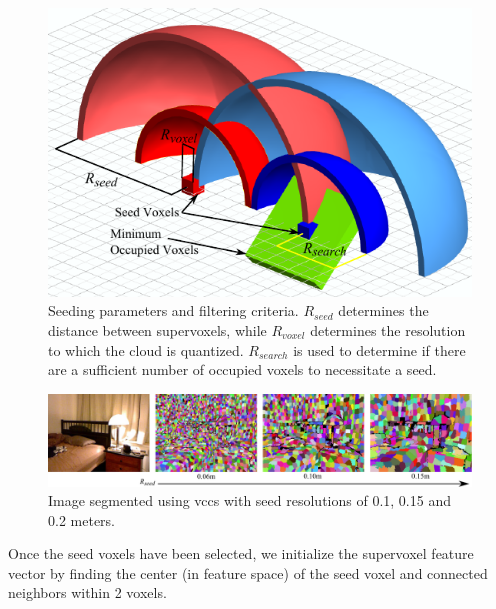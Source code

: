 \begin{figure}
\begin{center}
\includegraphics[width=0.9\linewidth]{figures/CVPR2013/MinimumOccupied.pdf}
\end{center}
   \caption[Seeding Parameters]{Seeding parameters and filtering criteria. ${R}_{seed}$ determines the distance between supervoxels, while ${R}_{voxel}$ determines the resolution to which the cloud is quantized. ${R}_{search}$ is used to determine if there are a sufficient number of occupied voxels to necessitate a seed. }
\label{fig:SeedingDiagram}
\end{figure}
\begin{figure}
\begin{center}
\includegraphics[width=1.0\linewidth]{figures/CVPR2013/IncreasingSeedSize.pdf}
\end{center}
   \caption[Seeding Size]{Image segmented using \gls{vccs} with seed resolutions of 0.1, 0.15 and 0.2 meters.}
\label{fig:SegmentedDiffSeeds}
\end{figure}
Once the seed voxels have been selected, we initialize the supervoxel feature vector by finding the center (in feature space) of the seed voxel and connected neighbors within 2 voxels. 

